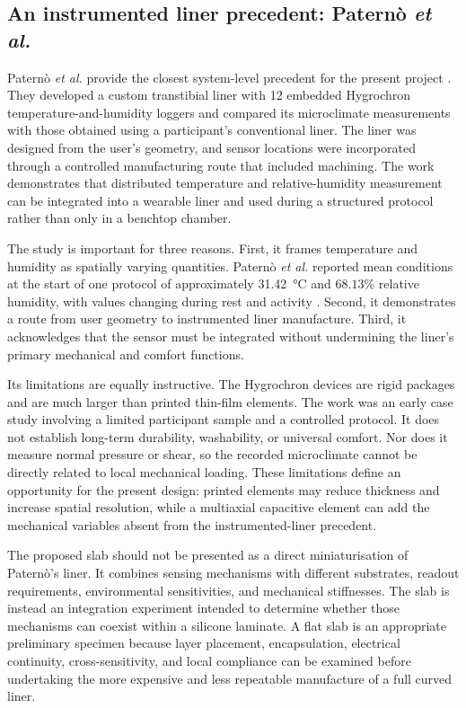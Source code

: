 \documentclass[12pt,a4paper]{article}
\begin{document}
\subsection{An instrumented liner precedent: Paternò \textit{et al.}}

Paternò \textit{et al.} provide the closest system-level precedent for the
present project \cite{paterno2020}. They developed a custom transtibial liner
with 12 embedded Hygrochron temperature-and-humidity loggers and compared its
microclimate measurements with those obtained using a participant's
conventional liner. The liner was designed from the user's geometry, and
sensor locations were incorporated through a controlled manufacturing route
that included machining. The work demonstrates that distributed temperature
and relative-humidity measurement can be integrated into a wearable liner and
used during a structured protocol rather than only in a benchtop chamber.

The study is important for three reasons. First, it frames temperature and
humidity as spatially varying quantities. Paternò \textit{et al.} reported mean
conditions at the start of one protocol of approximately
\SI{31.42}{\degreeCelsius} and \(68.13\%\) relative humidity, with values changing
during rest and activity \cite{paterno2020}. Second, it demonstrates a route
from user geometry to instrumented liner manufacture. Third, it acknowledges
that the sensor must be integrated without undermining the liner's primary
mechanical and comfort functions.

Its limitations are equally instructive. The Hygrochron devices are rigid
packages and are much larger than printed thin-film elements. The work was an
early case study involving a limited participant sample and a controlled
protocol. It does not establish long-term durability, washability, or universal
comfort. Nor does it measure normal pressure or shear, so the recorded
microclimate cannot be directly related to local mechanical loading. These
limitations define an opportunity for the present design: printed elements may
reduce thickness and increase spatial resolution, while a multiaxial
capacitive element can add the mechanical variables absent from the
instrumented-liner precedent.

The proposed slab should not be presented as a direct miniaturisation of
Paternò's liner. It combines sensing mechanisms with different substrates,
readout requirements, environmental sensitivities, and mechanical stiffnesses.
The slab is instead an integration experiment intended to determine whether
those mechanisms can coexist within a silicone laminate. A flat slab is an
appropriate preliminary specimen because layer placement, encapsulation,
electrical continuity, cross-sensitivity, and local compliance can be examined
before undertaking the more expensive and less repeatable manufacture of a
full curved liner.
\end{document}
